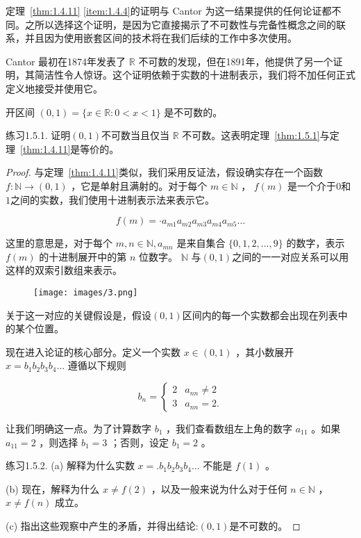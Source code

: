 定理~\ref{thm:1.4.11} \ref{item:1.4.4}的证明与 Cantor 为这一结果提供的任何论证都不同。之所以选择这个证明，是因为它直接揭示了不可数性与完备性概念之间的联系，并且因为使用嵌套区间的技术将在我们后续的工作中多次使用。

Cantor 最初在1874年发表了 \(\mathbb{R}\) 不可数的发现，但在1891年，他提供了另一个证明，其简洁性令人惊讶。这个证明依赖于实数的十进制表示，我们将不加任何正式定义地接受并使用它。

\begin{Thm}
\label{thm:1.5.1}
  开区间 \(\left( {0,1}\right)  = \{ x \in  \mathbb{R} : 0 < x < 1\}\) 是不可数的。
\end{Thm}

练习1.5.1. 证明$(0,1)$不可数当且仅当 \(\mathbb{R}\) 不可数。这表明定理~\ref{thm:1.5.1}与定理~\ref{thm:1.4.11}是等价的。

\begin{proof}
与定理~\ref{thm:1.4.11}类似，我们采用反证法，假设确实存在一个函数 \(f : \mathbb{N} \rightarrow  \left( {0,1}\right)\) ，它是单射且满射的。对于每个 \(m \in  \mathbb{N}\) ， \(f\left( m\right)\) 是一个介于$0$和$1$之间的实数，我们使用十进制表示法来表示它。

\[
f\left( m\right)  =  \cdot  {a}_{m1}{a}_{m2}{a}_{m3}{a}_{m4}{a}_{m5}\ldots
\]

这里的意思是，对于每个 \(m,n \in  \mathbb{N},{a}_{mn}\) 是来自集合 \(\{ 0,1,2,\ldots ,9\}\) 的数字，表示 \(f\left( m\right)\) 的十进制展开中的第 \(n\) 位数字。 \(\mathbb{N}\) 与$(0,1)$之间的一一对应关系可以用这样的双索引数组来表示。

\begin{figure}[h]
  \centering
  \texttt{[image: images/3.png]}
\end{figure}

关于这一对应的关键假设是，假设$(0,1)$区间内的每一个实数都会出现在列表中的某个位置。

现在进入论证的核心部分。定义一个实数 \(x \in  \left( {0,1}\right)\) ，其小数展开 \(x = {b}_{1}{b}_{2}{b}_{3}{b}_{4}\ldots\) 遵循以下规则

\[
{b}_{n} = \left\{  \begin{array}{ll} 2 & {a}_{nn} \neq  2 \\  3 & {a}_{nn} = 2. \end{array}\right.
\]

让我们明确这一点。为了计算数字 \({b}_{1}\) ，我们查看数组左上角的数字 \({a}_{11}\) 。如果 \({a}_{11} = 2\) ，则选择 \({b}_{1} = 3\) ；否则，设定 \({b}_{1} = 2\) 。

练习1.5.2. (a) 解释为什么实数 \(x = {.b}_{1}{b}_{2}{b}_{3}{b}_{4}\ldots\) 不能是 \(f\left( 1\right)\) 。

(b) 现在，解释为什么 \(x \neq  f\left( 2\right)\) ，以及一般来说为什么对于任何 \(n \in  \mathbb{N}\) ， \(x \neq  f\left( n\right)\) 成立。

(c) 指出这些观察中产生的矛盾，并得出结论:$(0,1)$是不可数的。
  
\end{proof}

